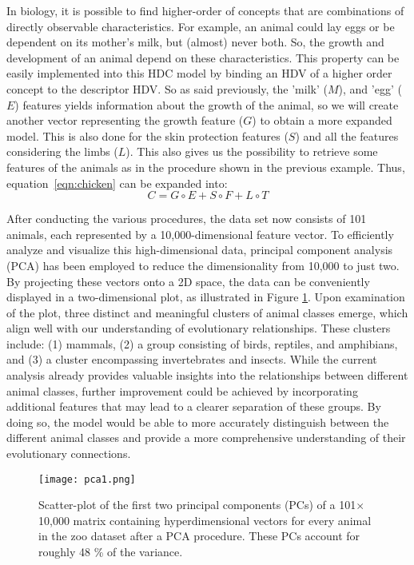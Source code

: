 In biology, it is possible to find higher-order of concepts that are combinations of directly observable characteristics. For example, an animal could lay eggs or be dependent on its mother's milk, but (almost) never both. So, the growth and development of an animal depend on these characteristics. This property can be easily implemented into this HDC model by binding an HDV of a higher order concept to the descriptor HDV. So as said previously, the 'milk' ($M$), and 'egg' ($E$) features yields information about the growth of the animal, so we will create another vector representing the growth feature ($G$) to obtain a more expanded model. This is also done for the skin protection features ($S$) and all the features considering the limbs ($L$). This also gives us the possibility to retrieve some features of the animals as in the procedure shown in the previous example. Thus, equation~\ref{eqn:chicken} can be expanded into:
\begin{equation}
    C = G \circ E + S \circ F + L \circ T
\end{equation}

After conducting the various procedures, the data set now consists of 101 animals, each represented by a 10,000-dimensional feature vector. To efficiently analyze and visualize this high-dimensional data, principal component analysis (PCA) has been employed to reduce the dimensionality from 10,000 to just two. By projecting these vectors onto a 2D space, the data can be conveniently displayed in a two-dimensional plot, as illustrated in Figure \ref{fig:exm2}. Upon examination of the plot, three distinct and meaningful clusters of animal classes emerge, which align well with our understanding of evolutionary relationships. These clusters include: (1) mammals, (2) a group consisting of birds, reptiles, and amphibians, and (3) a cluster encompassing invertebrates and insects. While the current analysis already provides valuable insights into the relationships between different animal classes, further improvement could be achieved by incorporating additional features that may lead to a clearer separation of these groups. By doing so, the model would be able to more accurately distinguish between the different animal classes and provide a more comprehensive understanding of their evolutionary connections.
\begin{figure}[h]
    \centering
    \texttt{[image: pca1.png]}
    \caption{Scatter-plot of the first two principal components (PCs) of a 101$\times$10,000 matrix containing hyperdimensional vectors for every animal in the zoo dataset after a PCA procedure. These PCs account for roughly 48 \% of the variance.}
    \label{fig:exm2}
\end{figure}

